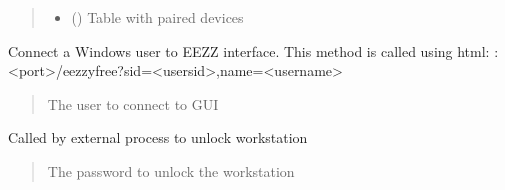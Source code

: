 \documentclass[letterpaper,10pt,english]{sphinxmanual}
\begin{document}
\begin{savenotes}
\begin{fulllineitems}
\begin{quote}
\begin{description}
\begin{itemize}
\item {} 
\sphinxAtStartPar
{} ({\hyperref[\detokenize{eezz:eezz.mobile.TMobileDevices}]{}}) \textendash{} Table with paired devices

\end{itemize}

\end{description}\end{quote}

\begin{savenotes}\begin{fulllineitems}
\label{\detokenize{eezz:eezz.session.TSession.connect}}
\pysigstartsignatures
{}
\pysigstopsignatures
\sphinxAtStartPar
Connect a Windows user to EEZZ interface. This method is called using html:
:\textless{}port\textgreater{}/eezzyfree?sid=\textless{}user\sphinxhyphen{}sid\textgreater{},name=\textless{}user\sphinxhyphen{}name\textgreater{}
\begin{quote}\begin{description}
\sphinxAtStartPar
{} \textendash{} The user to connect to GUI

\end{description}\end{quote}

\end{fulllineitems}\end{savenotes}


\begin{savenotes}\begin{fulllineitems}
\label{\detokenize{eezz:eezz.session.TSession.get_user_pwd}}
\pysigstartsignatures
{}
\pysigstopsignatures
\sphinxAtStartPar
Called by external process to unlock workstation
\begin{quote}\begin{description}
\sphinxAtStartPar
The password to unlock the workstation


\end{description}
\end{quote}
\end{fulllineitems}
\end{savenotes}
\end{fulllineitems}
\end{savenotes}
\end{document}

